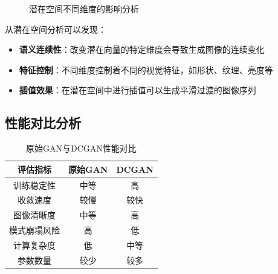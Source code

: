\documentclass[UTF8]{ctexart}
\begin{document}
\begin{figure}[H]
\centering
{}
\caption{潜在空间不同维度的影响分析}
\label{fig:latent_analysis}
\end{figure}

从潜在空间分析可以发现：
\begin{itemize}
\item \textbf{语义连续性}：改变潜在向量的特定维度会导致生成图像的连续变化
\item \textbf{特征控制}：不同维度控制着不同的视觉特征，如形状、纹理、亮度等
\item \textbf{插值效果}：在潜在空间中进行插值可以生成平滑过渡的图像序列
\end{itemize}

\subsection{性能对比分析}

\begin{table}[H]
\centering
\caption{原始GAN与DCGAN性能对比}
\begin{tabular}{|c|c|c|}
\hline
\textbf{评估指标} & \textbf{原始GAN} & \textbf{DCGAN} \\
\hline
训练稳定性 & 中等 & 高 \\
\hline
收敛速度 & 较慢 & 较快 \\
\hline
图像清晰度 & 中等 & 高 \\
\hline
模式崩塌风险 & 高 & 低 \\
\hline
计算复杂度 & 低 & 中等 \\
\hline
参数数量 & 较少 & 较多 \\
\hline
\end{tabular}
\end{table}
\end{document}

